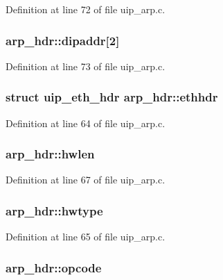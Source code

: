 Definition at line 72 of file uip\_\-arp.c.

\hypertarget{structarp__hdr_a63fdb5cc78ada39a43cbcbb654e8ae04}{
\subsubsection[{dipaddr}]{ {\bf arp\_\-hdr::dipaddr}\mbox{[}2\mbox{]}}}
\label{structarp__hdr_a63fdb5cc78ada39a43cbcbb654e8ae04}


Definition at line 73 of file uip\_\-arp.c.

\hypertarget{structarp__hdr_a68ea379da9c157e4cbc78fc8bc99b3e8}{
\subsubsection[{ethhdr}]{\setlength{\rightskip}{0pt plus 5cm}struct {\bf uip\_\-eth\_\-hdr} {\bf arp\_\-hdr::ethhdr}}}
\label{structarp__hdr_a68ea379da9c157e4cbc78fc8bc99b3e8}


Definition at line 64 of file uip\_\-arp.c.

\hypertarget{structarp__hdr_a9b432ff3eebf116a0e0e9bab7a1a71f0}{
\subsubsection[{hwlen}]{ {\bf arp\_\-hdr::hwlen}}}
\label{structarp__hdr_a9b432ff3eebf116a0e0e9bab7a1a71f0}


Definition at line 67 of file uip\_\-arp.c.

\hypertarget{structarp__hdr_a537766d09520854ecc2371ad9156279b}{
\subsubsection[{hwtype}]{ {\bf arp\_\-hdr::hwtype}}}
\label{structarp__hdr_a537766d09520854ecc2371ad9156279b}


Definition at line 65 of file uip\_\-arp.c.

\hypertarget{structarp__hdr_a195473a040b7bf59f59435f2e41a8864}{
\subsubsection[{opcode}]{ {\bf arp\_\-hdr::opcode}}}
\label{structarp__hdr_a195473a040b7bf59f59435f2e41a8864}


